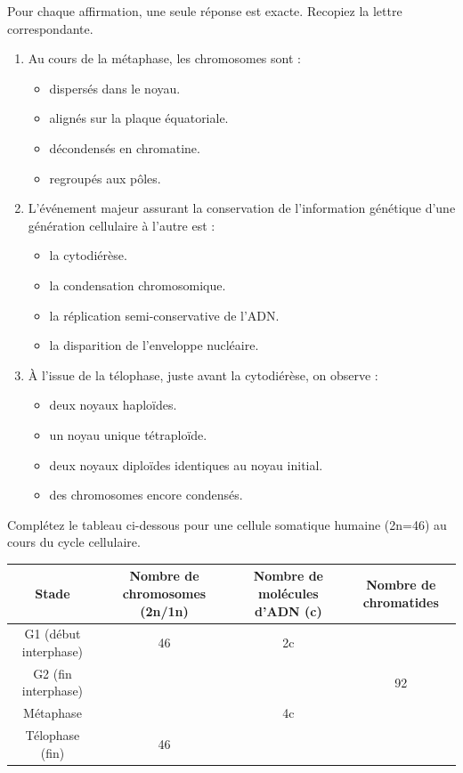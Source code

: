 \documentclass[11pt]{article}
\begin{document}
\begin{exercice}
Pour chaque affirmation, une seule réponse est exacte. Recopiez la lettre correspondante.
\begin{enumerate}
    \item Au cours de la métaphase, les chromosomes sont :
    \begin{itemize}
        \item[A.] dispersés dans le noyau.
        \item[B.] alignés sur la plaque équatoriale.
        \item[C.] décondensés en chromatine.
        \item[D.] regroupés aux pôles.
    \end{itemize}
    \item L'événement majeur assurant la conservation de l'information génétique d'une génération cellulaire à l'autre est :
    \begin{itemize}
        \item[A.] la cytodiérèse.
        \item[B.] la condensation chromosomique.
        \item[C.] la réplication semi-conservative de l'ADN.
        \item[D.] la disparition de l'enveloppe nucléaire.
    \end{itemize}
    \item À l'issue de la télophase, juste avant la cytodiérèse, on observe :
    \begin{itemize}
        \item[A.] deux noyaux haploïdes.
        \item[B.] un noyau unique tétraploïde.
        \item[C.] deux noyaux diploïdes identiques au noyau initial.
        \item[D.] des chromosomes encore condensés.
    \end{itemize}
\end{enumerate}
\end{exercice}

\begin{exercice}
Complétez le tableau ci-dessous pour une cellule somatique humaine (2n=46) au cours du cycle cellulaire.

\begin{tabular}{|c|c|c|c|}
\hline
\textbf{Stade} & \textbf{Nombre de chromosomes (2n/1n)} & \textbf{Nombre de molécules d'ADN (c)} & \textbf{Nombre de chromatides} \\
\hline
G1 (début interphase) & 46 & 2c &  \\
\hline
G2 (fin interphase) &  &  & 92 \\
\hline
Métaphase &  & 4c &  \\
\hline
Télophase (fin) & 46 &  &  \\
\hline
\end{tabular}
\end{exercice}
\end{document}
